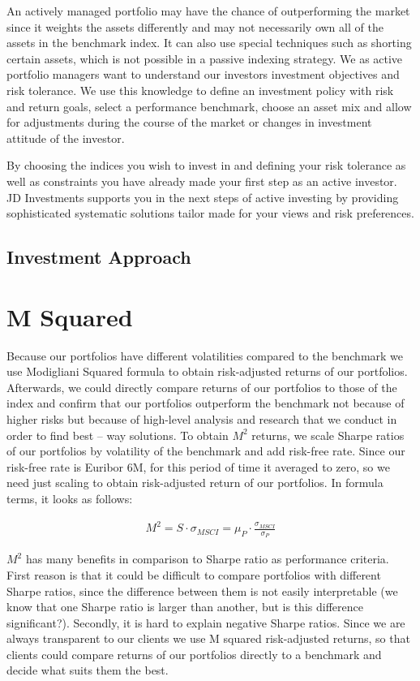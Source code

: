 \documentclass{scrreprt}
\begin{document}
An actively managed portfolio may have the chance of outperforming the market since it weights the assets differently and may not necessarily own all of the assets in the benchmark index.
It can also use special techniques such as shorting certain assets, which is not possible in a passive indexing strategy.
We as active portfolio managers want to understand our investors investment objectives and risk tolerance.
We use this knowledge to define an investment policy with risk and return goals, select a performance benchmark, choose an asset mix and allow for adjustments during the course of the market or changes in investment attitude of the investor.

By choosing the indices you wish to invest in and defining your risk tolerance as well as constraints you have already made your first step as an active investor.
JD Investments supports you in the next steps of active investing by providing sophisticated systematic solutions tailor made for your views and risk preferences.
 
\section*{Investment Approach}


\chapter*{M Squared}
Because our portfolios have different volatilities compared to the benchmark we use Modigliani Squared formula to obtain risk-adjusted returns of our portfolios. Afterwards, we could directly compare returns of our portfolios to those of the index and confirm that our portfolios outperform the benchmark not because of higher risks but because of high-level analysis and research that we conduct in order to find best – way solutions. To obtain $M^2$ returns, we scale Sharpe ratios of our portfolios by volatility of the benchmark and add risk-free rate. Since our risk-free rate is Euribor 6M, for this period of time it averaged to zero, so we need just scaling to obtain risk-adjusted return of our portfolios. In formula terms, it looks as follows:

\begin{align*}
  M^2 = S \cdot \sigma_{MSCI} = \mu_P \cdot \frac{\sigma_{MSCI}}{\sigma_P}
\end{align*}

$M^2$ has many benefits in comparison to Sharpe ratio as performance criteria.  First reason is that it could be difficult to compare portfolios with different Sharpe ratios, since the difference between them is not easily interpretable (we know that one Sharpe ratio is larger than another, but is this difference significant?). Secondly, it is hard to explain negative Sharpe ratios. Since we are always transparent to our clients we use M squared risk-adjusted returns, so that clients could compare returns of our portfolios directly to a benchmark and decide what suits them the best.
\end{document}
